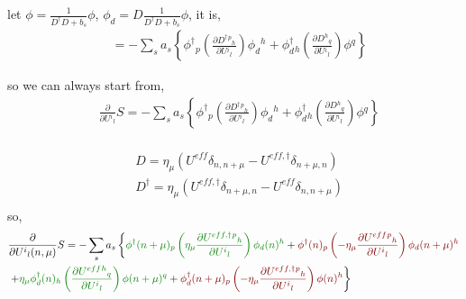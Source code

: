 let $\phi  = \frac{1}{D^{\dagger}D+b_s}\phi$, $\phi _d = D\frac{1}{D^{\dagger}D+b_s}\phi$, it is,
\begin{equation}
\begin{split}
&=-\sum _sa_s{} \left\{\phi ^{\dagger}{}_p\left(\frac{\partial D^{\dagger}{}^p{}_h}{\partial U{}^i{}_l} \right) \phi _d {}^h+ 
\phi _d^{\dagger}{}_h\left(\frac{\partial D{}^h{}_q}{\partial U{}^i{}_l}\right) \phi {}^q\right\}
\end{split}
\end{equation}

so we can always start from,
\textcolor[rgb]{0,0,1}{
\begin{equation}
\begin{split}
&\frac{\partial}{\partial U{}^i{}_l}S=-\sum _sa_s{} \left\{\phi ^{\dagger}{}_p\left(\frac{\partial D^{\dagger}{}^p{}_h}{\partial U{}^i{}_l} \right) \phi _d {}^h+ 
\phi _d^{\dagger}{}_h\left(\frac{\partial D{}^h{}_q}{\partial U{}^i{}_l}\right) \phi {}^q\right\}\\
\end{split}
\end{equation}
}

\begin{equation}
\begin{split}
&D=\eta_{\mu}\left(U^{eff}\delta_{n,n+\mu} - U^{eff,\dagger}\delta_{n+\mu,n}\right)\\
&D^{\dagger}=\eta_{\mu}\left(U^{eff,\dagger}\delta_{n+\mu,n} - U^{eff}\delta_{n,n+\mu}\right)\\
\end{split}
\end{equation}
so,
\begin{equation}
\begin{split}
&\frac{\partial}{\partial U{}^i{}_l(n,\mu)}S=-\sum _sa_s{} \left\{\textcolor[rgb]{0,0.5,0}{\phi ^{\dagger}(n+\mu){}_p\left(\eta_{\mu}\frac{\partial U^{eff,\dagger}{}^p{}_h}{\partial U{}^i{}_l} \right) \phi _d(n) {}^h}+\textcolor[rgb]{0.5,0,0}{\phi ^{\dagger}(n){}_p\left(-\eta_{\mu}\frac{\partial U^{eff}{}^p{}_h}{\partial U{}^i{}_l} \right) \phi _d(n+\mu) {}^h}\right.\\
&\left.+ \textcolor[rgb]{0,0.5,0}{\eta_{\mu}
\phi _d^{\dagger}(n){}_h\left(\frac{\partial U^{eff}{}^h{}_q}{\partial U{}^i{}_l}\right) \phi (n+\mu){}^q}+\textcolor[rgb]{0.5,0,0}{\phi _d^{\dagger}(n+\mu){}_p\left(-\eta_{\mu}\frac{\partial U^{eff,\dagger}{}^p{}_h}{\partial U{}^i{}_l} \right) \phi (n) {}^h}\right\}\\
\end{split}
\end{equation}

